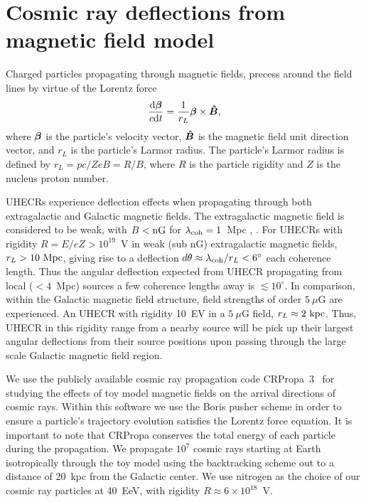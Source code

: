 \documentclass[usenatbib]{mnras}
\newcommand{\bfm}[1]{\mbox{\boldmath$ #1 $}}
\begin{document}







\section{Cosmic ray deflections from magnetic field model}
\label{Deflections}

Charged particles propagating through magnetic fields, precess around the field lines by virtue of the Lorentz force 
\begin{eqnarray}
\frac{{\rm d}\bfm{\beta}}{c{\rm d}t} = \frac{1}{r_{L}}\bfm{\beta}\times \bfm{\hat{B}}, 
\end{eqnarray}
where $\bfm{\beta}$ is the particle's velocity vector, $\bfm{\hat{B}}$ is the magnetic field unit direction vector, and $r_{L}$ is the particle's Larmor radius. The particle's Larmor radius is defined by $r_{L}=pc/ZeB=R/B$, where $R$ is the particle rigidity and $Z$ is the nucleus proton number. 

UHECRs experience deflection effects when propagating through both extragalactic and Galactic magnetic fields. The extragalactic magnetic field is considered to be weak, with $B < \rm {nG}$ for $\lambda_{\rm coh}=1$~Mpc \cite{Blasi_1999}, \cite{Kronberg_2007}. For UHECRs with rigidity $R=E/eZ > 10^{19}$~V in weak (sub nG) extragalactic magnetic fields, $r_{L}>{\rm 10~Mpc}$, giving rise to a deflection $d\theta\approx \lambda_{\rm coh}/r_{L}<6^{\circ}$ each coherence length. Thus the angular deflection expected from UHECR propagating from local ($<4$~Mpc) sources a few coherence lengths away is $\lesssim 10^{\circ}$. In comparison, within the Galactic magnetic field structure, field strengths of order $5~\mu$G are experienced. An UHECR with rigidity 10~EV in a $5~\mu$G field, $r_L \approx 2 ~ \rm kpc$. Thus, UHECR in this rigidity range from a nearby source will be pick up their largest angular deflections from their source positions upon passing through the large scale Galactic magnetic field region.

We use the publicly available cosmic ray propagation code CRPropa~3~\cite{CRPropa3_2016} for studying the effects of toy model magnetic fields on the arrival directions of cosmic rays. Within this software we use the Boris pusher scheme in order to ensure a particle's trajectory evolution satisfies the Lorentz force equation. It is important to note that CRPropa conserves the total energy of each particle during the propagation.
We propagate $10^7$ cosmic rays starting at Earth isotropically through the toy model using the backtracking scheme out to a distance of 20~kpc from the Galactic center. We use nitrogen as the choice of our cosmic ray particles at 40~EeV, with rigidity $R\approx 6 \times 10^{18}$~V. 
\end{document}
